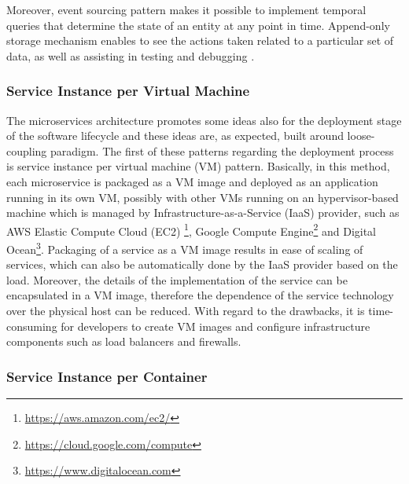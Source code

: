\documentclass{Configuration_Files/PoliMi3i_thesis}
\begin{document}
Moreover, event sourcing pattern makes it possible to implement temporal queries that determine the state of an entity at any point in time.
Append-only storage mechanism enables to see the actions taken related to a particular set of data, as well as assisting in testing and debugging \cite{event_sourcing_docs}.

\subsubsection{Service Instance per Virtual Machine}
\label{subsubsec:per_vm}

The microservices architecture promotes some ideas also for the deployment stage of the software lifecycle and these ideas are, as expected, built around loose-coupling paradigm.
The first of these patterns regarding the deployment process is service instance per virtual machine (VM) pattern.
Basically, in this method, each microservice is packaged as a VM image and deployed as an application running in its own VM, possibly with other VMs running on an hypervisor-based machine which is managed by Infrastructure-as-a-Service (IaaS) provider, such as AWS Elastic Compute Cloud (EC2) \footnote{\href{https://aws.amazon.com/ec2/}{https://aws.amazon.com/ec2/}}, Google Compute Engine\footnote{\href{https://cloud.google.com/compute}{https://cloud.google.com/compute}} and Digital Ocean\footnote{\href{https://www.digitalocean.com}{https://www.digitalocean.com}}.
Packaging of a service as a VM image results in ease of scaling of services, which can also be automatically done by the IaaS provider based on the load.
Moreover, the details of the implementation of the service can be encapsulated in a VM image, therefore the dependence of the service technology over the physical host can be reduced.
With regard to the drawbacks, it is time-consuming for developers to create VM images and configure infrastructure components such as load balancers and firewalls.

\subsubsection{Service Instance per Container}
\label{subsubsec:per_container}
\end{document}

